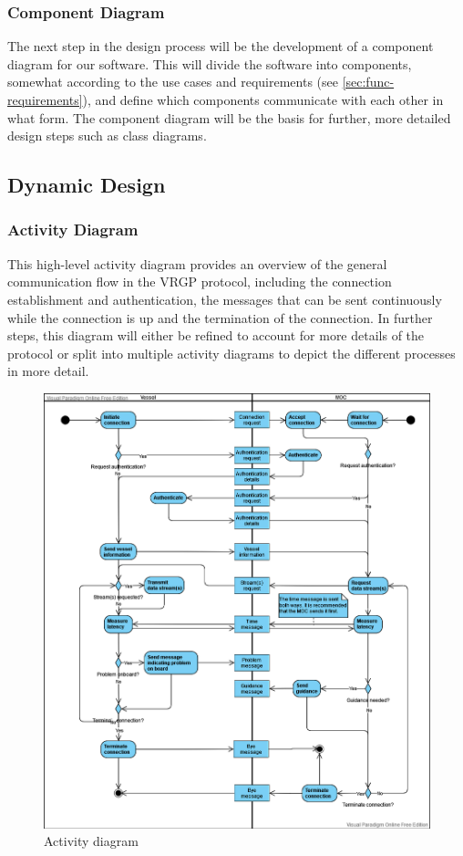 \subsubsection{Component Diagram}

The next step in the design process will be the development of a component diagram for our software. This will divide the software into components, somewhat according to the use cases and requirements (see \ref{sec:func-requirements}), and define which components communicate with each other in what form. The component diagram will be the basis for further, more detailed design steps such as class diagrams.

\subsection{Dynamic Design}\label{sec:dynamic-design}

\subsubsection{Activity Diagram}

This high-level activity diagram provides an overview of the general communication flow in the VRGP protocol, including the connection establishment and authentication, the messages that can be sent continuously while the connection is up and the termination of the connection. In further steps, this diagram will either be refined to account for more details of the protocol or split into multiple activity diagrams to depict the different processes in more detail.

\begin{figure}[ht]
	\centering
	\includegraphics[width=\linewidth]{uml/activity-diagram}
	\caption{Activity diagram}
	\label{fig:activity-diagram}
\end{figure}

